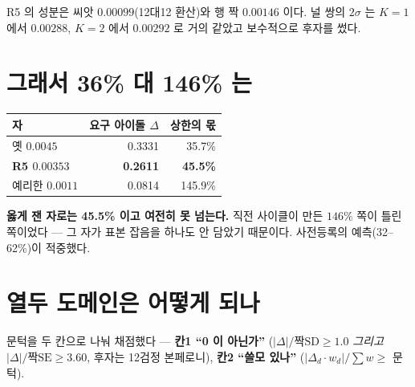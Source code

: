 \documentclass[10pt]{article}
\begin{document}
R5 의 성분은 씨앗 $0.00099$(12대12 환산)와 행 짝 $0.00146$ 이다. 널 쌍의
$2\sigma$ 는 $K{=}1$ 에서 $0.00288$, $K{=}2$ 에서 $0.00292$ 로 거의 같았고
보수적으로 후자를 썼다.


\section{그래서 36\% 대 146\% 는}

\begin{center}\small
\begin{tabular}{lrr}
\toprule
자 & 요구 아이돌 $\Delta$ & 상한의 몫 \\
\midrule
옛 $0.0045$ & 0.3331 & 35.7\% \\
\textbf{R5 $0.00353$} & \textbf{0.2611} & \textbf{45.5\%} \\
예리한 $0.0011$ & 0.0814 & 145.9\% \\
\bottomrule
\end{tabular}
\end{center}

\textbf{옳게 잰 자로는 45.5\% 이고 여전히 못 넘는다.} 직전 사이클이 만든
$146\%$ 쪽이 틀린 쪽이었다 --- 그 자가 표본 잡음을 하나도 안 담았기 때문이다.
사전등록의 예측(32--62\%)이 적중했다.

\section{열두 도메인은 어떻게 되나}

문턱을 두 칸으로 나눠 채점했다 --- \textbf{칸1 ``0 이 아닌가''}
($|\Delta|/\text{짝SD} \ge 1.0$ \emph{그리고} $|\Delta|/\text{짝SE} \ge 3.60$,
후자는 12검정 본페로니), \textbf{칸2 ``쓸모 있나''}
($|\Delta_d \cdot w_d| / \sum w \ge$ 문턱).
\end{document}
